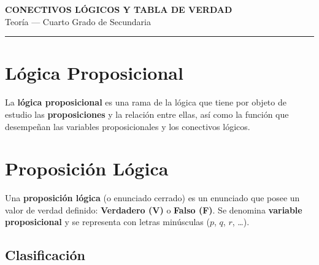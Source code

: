 \documentclass[12pt,a4paper]{article}
\begin{document}
\begin{center}
  {\LARGE\bfseries\color{primario} CONECTIVOS LÓGICOS Y TABLA DE VERDAD}\\[4pt]
  {\large Teoría — Cuarto Grado de Secundaria}\\[2pt]
  \textcolor{gray}{\rule{0.6\linewidth}{0.6pt}}
\end{center}

\vspace{6pt}

\section{Lógica Proposicional}

\begin{definicion}
La \textbf{lógica proposicional} es una rama de la lógica que tiene por objeto de
estudio las \textbf{proposiciones} y la relación entre ellas, así como la función que
desempeñan las variables proposicionales y los conectivos lógicos.
\end{definicion}

\section{Proposición Lógica}

\begin{definicion}
Una \textbf{proposición lógica} (o enunciado cerrado) es un enunciado que posee un
valor de verdad definido: \textbf{Verdadero (V)} o \textbf{Falso (F)}.  Se denomina
\textbf{variable proposicional} y se representa con letras minúsculas ($p$, $q$, $r$, \ldots).
\end{definicion}

\subsection{Clasificación}
\end{document}
